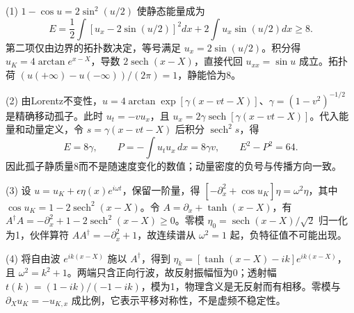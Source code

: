 (1) \(1-\cos u=2\sin^2(u/2)\) 使静态能量成为
\[
E=\frac12\int[u_x-2\sin(u/2)]^2dx+2\int u_x\sin(u/2)dx\ge8.
\]
第二项仅由边界的拓扑数决定，等号满足 \(u_x=2\sin(u/2)\)。积分得 \(\boxed{u_K=4\arctan e^{x-X}}\)，导数 \(2\operatorname{sech}(x-X)\)，直接代回 \(u_{xx}=\sin u\) 成立。拓扑荷 \((u(+\infty)-u(-\infty))/(2\pi)=1\)，静能恰为8。

(2) 由Lorentz不变性，\(u=4\arctan\exp[\gamma(x-vt-X)]\)、\(\gamma=(1-v^2)^{-1/2}\) 是精确移动孤子。此时 \(u_t=-vu_x\)，且 \(u_x=2\gamma\operatorname{sech}[\gamma(x-vt-X)]\)。代入能量和动量定义，令 \(s=\gamma(x-vt-X)\) 后积分 \(\operatorname{sech}^2s\)，得
\[
E=8\gamma,\qquad P=-\int u_tu_x\,dx=8\gamma v,\qquad E^2-P^2=64.
\]
因此孤子静质量8而不是随速度变化的数值；动量密度的负号与传播方向一致。

(3) 设 \(u=u_K+\epsilon\eta(x)e^{i\omega t}\)，保留一阶量，得 \([-\partial_x^2+\cos u_K]\eta=\omega^2\eta\)，其中 \(\cos u_K=1-2\operatorname{sech}^2(x-X)\)。令 \(A=\partial_x+\tanh(x-X)\)，有 \(A^\dagger A=-\partial_x^2+1-2\operatorname{sech}^2(x-X)\ge0\)。零模 \(\eta_0=\operatorname{sech}(x-X)/\sqrt2\) 归一化为1，伙伴算符 \(AA^\dagger=-\partial_x^2+1\)，故连续谱从 \(\omega^2=1\) 起，负特征值不可能出现。

(4) 将自由波 \(e^{ik(x-X)}\) 施以 \(A^\dagger\)，得到 \(\eta_k=[\tanh(x-X)-ik]e^{ik(x-X)}\)，且 \(\omega^2=k^2+1\)。两端只含正向行波，故反射振幅恒为0；透射幅 \(t(k)=(1-ik)/(-1-ik)\)，模为1，物理含义是无反射而有相移。零模与 \(\partial_Xu_K=-u_{K,x}\) 成比例，它表示平移对称性，不是虚频不稳定性。
